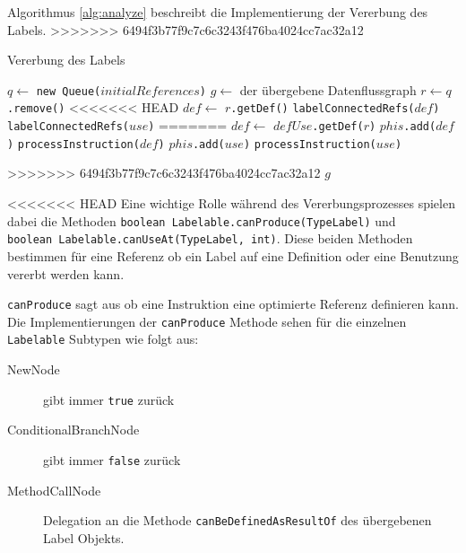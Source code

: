 Algorithmus \ref{alg:analyze} beschreibt die Implementierung der Vererbung 
des Labels.
>>>>>>> 6494f3b77f9c7c6c3243f476ba4024cc7ac32a12

\begin{algorithm}[H]
	\caption{Vererbung des Labels}\label{alg:analyze}
	\begin{algorithmic}[1]
		\STATE $q \gets$ \texttt{new Queue($initialReferences$)}
		\STATE $g \gets$ der übergebene Datenflussgraph
			\STATE $r \gets q$\texttt{.remove()}
<<<<<<< HEAD
				\STATE $def \gets$ \texttt{$r$.getDef()}
					\STATE \texttt{labelConnectedRefs($def$)}
				\ENDIF
						\STATE \texttt{labelConnectedRefs($use$)}
					\ENDIF
				\ENDFOR
=======
				\STATE $def \gets$ \texttt{$defUse$.getDef($r$)}
					\STATE \texttt{$phis$.add($def$)}
				\ELSE
						\STATE \texttt{processInstruction($def$)}
					\ENDIF
				\ENDIF
						\STATE \texttt{$phis$.add($use$)}
					\ELSE
							\STATE \texttt{processInstruction($use$)}
						\ENDIF
					\ENDIF
				\ENDFOR

>>>>>>> 6494f3b77f9c7c6c3243f476ba4024cc7ac32a12
			\ENDIF
		\ENDWHILE
		\RETURN $g$
	\end{algorithmic}
\end{algorithm}

<<<<<<< HEAD
Eine wichtige Rolle während des Vererbungsprozesses spielen dabei die Methoden 
\texttt{boolean Labelable.canProduce(TypeLabel)} und \\
\texttt{boolean Labelable.canUseAt(TypeLabel, int)}. Diese beiden Methoden bestimmen 
für eine Referenz ob ein Label auf eine Definition oder eine Benutzung vererbt werden kann.

\texttt{canProduce} sagt aus ob eine Instruktion eine optimierte Referenz definieren kann. 
Die Implementierungen der \texttt{canProduce} Methode sehen für die einzelnen \texttt{Labelable}
Subtypen wie folgt aus:

\begin{description}
	\item[NewNode] gibt immer \texttt{true} zurück
	\item[ConditionalBranchNode] gibt immer \texttt{false} zurück
	\item[MethodCallNode] Delegation an die Methode \texttt{canBeDefinedAsResultOf} des 
	übergebenen Label Objekts.
\end{description}

